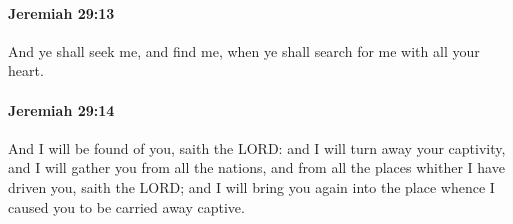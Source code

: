 		\paragraph{Jeremiah 29:13} %
			\label{JEREMIAH-29-13}

			And ye shall seek me, and find me, when ye shall search for me with all your heart.


		\paragraph{Jeremiah 29:14} %
			\label{JEREMIAH-29-14}

			And I will be found of you, saith the LORD: and I will turn away your captivity, and I will gather you from all the nations, and from all the places whither I have driven you, saith the LORD; and I will bring you again into the place whence I caused you to be carried away captive.

